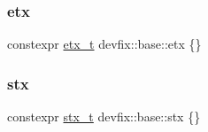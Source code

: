 \subsubsection{\texorpdfstring{etx}{etx}}
{\footnotesize\ttfamily constexpr \hyperlink{structdevfix_1_1base_1_1etx__t}{etx\+\_\+t} devfix\+::base\+::etx \{\}\hspace{0.3cm}{\ttfamily [static]}}

\mbox{\label{namespacedevfix_1_1base_af808feea9b7c85902ead58a187f6cced}} 
\subsubsection{\texorpdfstring{stx}{stx}}
{\footnotesize\ttfamily constexpr \hyperlink{structdevfix_1_1base_1_1stx__t}{stx\+\_\+t} devfix\+::base\+::stx \{\}\hspace{0.3cm}{\ttfamily [static]}}

